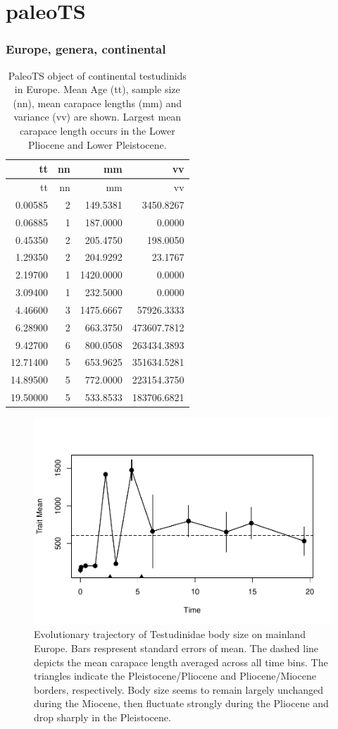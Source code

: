 \section{paleoTS}

\subsubsection*{Europe, genera, continental}\label{europe-genera-continental}

\begin{longtable}[]{@{}rrrr@{}}
	\caption[PaleoTS object of continental \T in Europe]{PaleoTS object of continental testudinids in Europe. Mean Age (tt), sample size (nn), mean carapace lengths (mm) and variance (vv) are shown. Largest mean carapace length occurs in the Lower Pliocene and Lower Pleistocene.}
	\label{tab:pTSEuC}\tabularnewline
	\toprule
	tt & nn & mm & vv\tabularnewline
	\midrule
	\endfirsthead
	\toprule
	tt & nn & mm & vv\tabularnewline
	\midrule
	\endhead
	0.00585 & 2 & 149.5381 & 3450.8267\tabularnewline
	0.06885 & 1 & 187.0000 & 0.0000\tabularnewline
	0.45350 & 2 & 205.4750 & 198.0050\tabularnewline
	1.29350 & 2 & 204.9292 & 23.1767\tabularnewline
	2.19700 & 1 & 1420.0000 & 0.0000\tabularnewline
	3.09400 & 1 & 232.5000 & 0.0000\tabularnewline
	4.46600 & 3 & 1475.6667 & 57926.3333\tabularnewline
	6.28900 & 2 & 663.3750 & 473607.7812\tabularnewline
	9.42700 & 6 & 800.0508 & 263434.3893\tabularnewline
	12.71400 & 5 & 653.9625 & 351634.5281\tabularnewline
	14.89500 & 5 & 772.0000 & 223154.3750\tabularnewline
	19.50000 & 5 & 533.8533 & 183706.6821\tabularnewline
	\bottomrule
\end{longtable}

\begin{figure}[H]
	\centering
	\includegraphics{MA_JJ_files/figure-latex/pTSEuC-1.pdf}
	\caption[PaleoTS plot of continental \T in Europe]{Evolutionary trajectory of Testudinidae body size on mainland Europe. Bars respresent standard errors of mean. The dashed line depicts the mean carapace length averaged across all time bins. The triangles indicate the Pleistocene/Pliocene and Pliocene/Miocene borders, respectively. Body size seems to remain largely unchanged during the Miocene, then fluctuate strongly during the Pliocene and drop sharply in the Pleistocene.}
	\label{fig:pTSEuC}
\end{figure}


